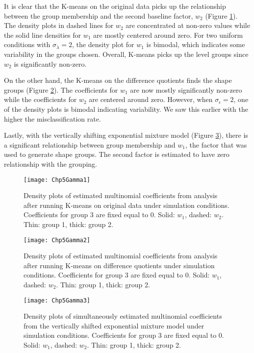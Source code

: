 It is clear that the K-means on the original data picks up the relationship between the group membership and the second baseline factor, $w_{2}$ (Figure \ref{fig:gamma1}). The density plots in dashed lines for $w_{2}$ are concentrated at non-zero values while the solid line densities for $w_{1}$ are mostly centered around zero. For two uniform conditions with $\sigma_{\lambda}=2$, the density plot for $w_{1}$ is bimodal, which indicates some variability in the groups chosen. Overall, K-means picks up the level groups since $w_{2}$ is significantly non-zero.

On the other hand, the K-means on the difference quotients finds the shape groups (Figure \ref{fig:gamma2}). The coefficients for $w_{1}$ are now mostly significantly non-zero while the coefficients for $w_{2}$ are centered around zero. However, when $\sigma_{\epsilon}=2$, one of the density plots is bimodal indicating variability. We saw this earlier with the higher the misclassification rate.

Lastly, with the vertically shifting exponential mixture model (Figure \ref{fig:gamma3}), there is a significant relationship between group membership and $w_{1}$, the factor that was used to generate shape groups. The second factor is estimated to have zero relationship with the grouping.
\begin{landscape}
\begin{figure}[h]
\centering
\texttt{[image: Chp5Gamma1]}
\label{fig:gamma1}
\caption{Density plots of estimated multinomial coefficients from analysis after running K-means on original data under  simulation conditions. Coefficients for group 3 are fixed equal to 0. Solid: $w_{1}$, dashed: $w_{2}$. Thin: group 1, thick:  group 2.}
\end{figure}
\begin{figure}[h]
\centering
\texttt{[image: Chp5Gamma2]}
\label{fig:gamma2}
\caption{Density plots of estimated multinomial coefficients from analysis after running K-means on difference quotients under simulation conditions. Coefficients for group 3 are fixed equal to 0. Solid: $w_{1}$, dashed: $w_{2}$. Thin: group 1, thick:  group 2.}
\end{figure}
\begin{figure}[h]
\centering
\texttt{[image: Chp5Gamma3]}
\label{fig:gamma3}
\caption{Density plots of simultaneously estimated multinomial coefficients from the vertically shifted exponential mixture model under simulation conditions. Coefficients for group 3 are fixed equal to 0. Solid: $w_{1}$, dashed: $w_{2}$. Thin: group 1, thick:  group 2.}
\end{figure}
\end{landscape}

